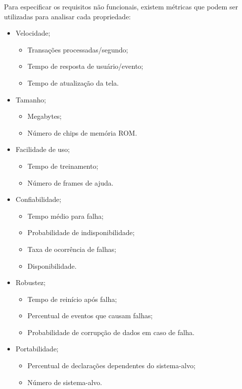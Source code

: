 \documentclass[a4paper,twoside]{article}
\begin{document}
Para especificar os requisitos não funcionais, existem métricas que podem ser utilizadas para analisar cada propriedade\cite{Sommerville_2011_texbook}:
\begin{itemize}
    \item Velocidade;
    \begin{itemize}
        \item Transações processadas/segundo;
        \item Tempo de resposta de usuário/evento;
        \item Tempo de atualização da tela.
    \end{itemize}
    \item Tamanho;
    \begin{itemize}
        \item Megabytes;
        \item Número de chips de memória ROM.
    \end{itemize}
    \item Facilidade de uso;
    \begin{itemize}
        \item Tempo de treinamento;
        \item Número de frames de ajuda.
    \end{itemize}
    \item Confiabilidade;
    \begin{itemize}
        \item Tempo médio para falha;
        \item Probabilidade de indisponibilidade;
        \item Taxa de ocorrência de falhas;
        \item Disponibilidade.
    \end{itemize}
    \item Robustez;
    \begin{itemize}
        \item Tempo de reinício após falha;
        \item Percentual de eventos que causam falhas;
        \item Probabilidade de corrupção de dados em caso de falha.
    \end{itemize}
    \item Portabilidade;
    \begin{itemize}
        \item Percentual de declarações dependentes do sistema-alvo;
        \item Número de sistema-alvo.
    \end{itemize}
\end{itemize}
\end{document}
